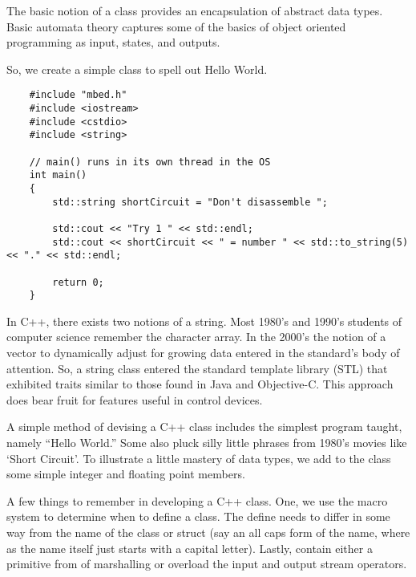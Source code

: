\documentclass{article}
\begin{document}
The basic notion of a class provides an encapsulation of abstract data types.   Basic automata theory captures some of the basics of object oriented programming as input, states, and outputs. 

So, we create a simple class to spell out Hello World. %


\begin{lstlisting}
	#include "mbed.h"
	#include <iostream>
	#include <cstdio>
	#include <string>

	// main() runs in its own thread in the OS
	int main()
	{
	    std::string shortCircuit = "Don't disassemble ";
    
	    std::cout << "Try 1 " << std::endl;
	    std::cout << shortCircuit << " = number " << std::to_string(5) << "." << std::endl;

		return 0;
	}
\end{lstlisting}


In C++, there exists two notions of a string.  Most 1980's and 1990's students of computer science remember the character array.  In the 2000's the notion of a vector to dynamically adjust for growing data entered in the standard's body of attention.  So, a string class entered the standard template library (STL) that exhibited traits similar to those found in Java and Objective-C.  This approach does bear fruit for features useful in control devices.

A simple method of devising a C++ class includes the simplest program taught, namely ``Hello World.''  Some also pluck silly little phrases from 1980's movies like `Short Circuit'.  To illustrate a little mastery of data types, we add to the class some simple integer and floating point members.  

A few things to remember in developing a C++ class.  One, we use the macro system to determine when to define a class.  The define needs to differ in some way from the name of the class or struct (say an all caps form of the name, where as the name itself just starts with a capital letter).  Lastly, contain either a primitive from of marshalling or overload the input and output stream operators.
\end{document}
